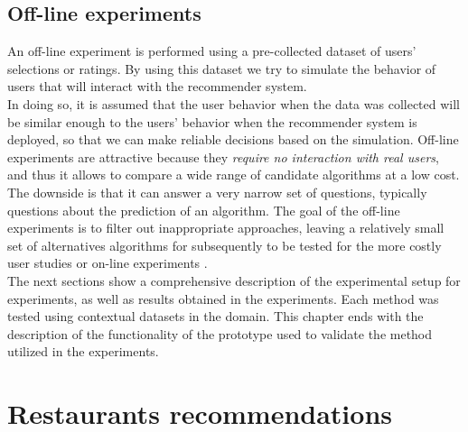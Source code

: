 \subsection{Off-line experiments} 

An off-line experiment is performed using a pre-collected dataset
of users' selections or ratings. By using this dataset we try to simulate
the behavior of users that will interact with the recommender system. \\ In
doing so, it is assumed that the user behavior when the data was collected
will be similar enough to the users' behavior when the recommender
system is deployed, so that we can make reliable decisions based on
the simulation.  Off-line experiments are attractive because they
\textit{require no interaction with real users}, and thus it allows to compare
a wide range of candidate algorithms at a low cost. \\ The downside is
that it can answer a very narrow set of questions, typically questions
about the prediction of an algorithm. The goal of the off-line
experiments is to filter out inappropriate  approaches, leaving a
relatively small set of alternatives algorithms for subsequently to be
tested for the more costly user studies or on-line
experiments  \cite{adomavicius2011context}.\\
The next sections show a comprehensive description of the 
experimental setup for experiments, as well as results obtained 
in the experiments. Each method was tested using contextual 
datasets in the domain.  This chapter ends with the  
description of the functionality of the prototype used to 
validate the method utilized in the experiments.

\section{Restaurants recommendations} \label{restaurants}

